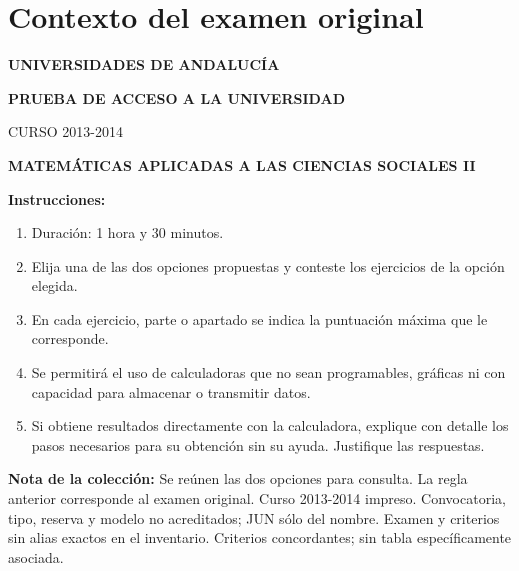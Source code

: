 \section*{Contexto del examen original}
\textbf{UNIVERSIDADES DE ANDALUCÍA}\par
\textbf{PRUEBA DE ACCESO A LA UNIVERSIDAD}\par
CURSO 2013-2014\par
\textbf{MATEMÁTICAS APLICADAS A LAS CIENCIAS SOCIALES II}

\textbf{Instrucciones:}
\begin{enumerate}[label=\textbf{\alph*)}]
  \item Duración: 1 hora y 30 minutos.
  \item Elija una de las dos opciones propuestas y conteste los ejercicios de la opción elegida.
  \item En cada ejercicio, parte o apartado se indica la puntuación máxima que le corresponde.
  \item Se permitirá el uso de calculadoras que no sean programables, gráficas ni con capacidad para almacenar o transmitir datos.
  \item Si obtiene resultados directamente con la calculadora, explique con detalle los pasos necesarios para su obtención sin su ayuda. Justifique las respuestas.
\end{enumerate}
\noindent\textbf{Nota de la colección:} Se reúnen las dos opciones para consulta. La regla anterior corresponde al examen original. Curso 2013-2014 impreso. Convocatoria, tipo, reserva y modelo no acreditados; JUN sólo del nombre. Examen y criterios sin alias exactos en el inventario. Criterios concordantes; sin tabla específicamente asociada.
\par\medskip
